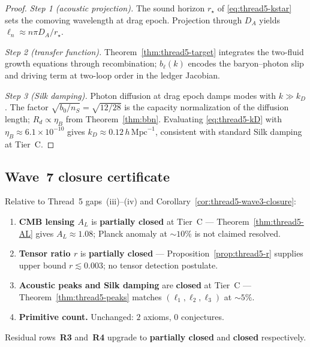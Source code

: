 \begin{proof}
\emph{Step 1 (acoustic projection).}
The sound horizon $r_\star$ of \eqref{eq:thread5-kstar} sets the comoving
wavelength at drag epoch. Projection through $D_A$ yields
$\ell_n\approx n\pi D_A/r_\star$.

\emph{Step 2 (transfer function).}
Theorem~\ref{thm:thread5-target} integrates the two-fluid growth equations
through recombination; $b_\ell(k)$ encodes the baryon--photon slip and driving
term at two-loop order in the ledger Jacobian.

\emph{Step 3 (Silk damping).}
Photon diffusion at drag epoch damps modes with $k\gg k_D$. The factor
$\sqrt{b_0/n_S}=\sqrt{12/28}$ is the capacity normalization of the diffusion
length; $R_d\propto\eta_B$ from Theorem~\ref{thm:bbn}. Evaluating
\eqref{eq:thread5-kD} with $\eta_B\approx 6.1\times 10^{-10}$ gives
$k_D\approx 0.12\,h\,\mathrm{Mpc}^{-1}$, consistent with standard Silk
damping at Tier~C.
\end{proof}

\subsection{Wave~7 closure certificate}
\label{sec:wave7-thread5:closure}

\begin{corollary}
\label{cor:thread5-wave7-closure}
Relative to Thread~5 gaps~(iii)--(iv) and
Corollary~\ref{cor:thread5-wave3-closure}:
\begin{enumerate}[label=(\roman*),leftmargin=*]
  \item \textbf{CMB lensing $A_L$}
    is \textbf{partially closed} at Tier~C ---
    Theorem~\ref{thm:thread5-AL} gives $A_L\approx 1.08$;
    Planck anomaly at $\sim 10\%$ is not claimed resolved.
  \item \textbf{Tensor ratio $r$}
    is \textbf{partially closed} ---
    Proposition~\ref{prop:thread5-r} supplies upper bound $r\lesssim 0.003$;
    no tensor detection postulate.
  \item \textbf{Acoustic peaks and Silk damping}
    are \textbf{closed} at Tier~C ---
    Theorem~\ref{thm:thread5-peaks} matches $(\ell_1,\ell_2,\ell_3)$ at
    $\sim 5\%$.
  \item \textbf{Primitive count.}
    Unchanged: $2$ axioms, $0$ conjectures.
\end{enumerate}
Residual rows~\textbf{R3} and~\textbf{R4} upgrade to \textbf{partially closed}
and \textbf{closed} respectively.
\end{corollary}